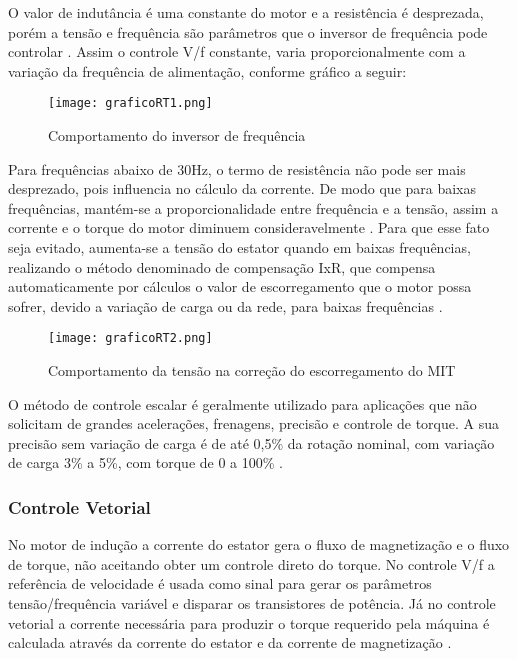 				O valor de indutância é uma constante do motor e a resistência é desprezada, porém a tensão e frequência são parâmetros que o inversor de frequência pode controlar \cite{WEGIF}. Assim o controle V/f constante, varia proporcionalmente com a variação da frequência de alimentação, conforme gráfico a seguir:

				\begin{figure}[!h]
					\centering
					\texttt{[image: graficoRT1.png]}
					\caption[Comportamento do inversor de frequência]{Comportamento do inversor de frequência \cite{WEGIF}} 
					\label{graficoRT1}
				\end{figure}

				Para frequências abaixo de 30Hz, o termo de resistência não pode ser mais desprezado, pois influencia no cálculo da corrente. De modo que para baixas frequências, mantém-se a proporcionalidade entre frequência e a tensão, assim a corrente e o torque do motor diminuem consideravelmente \cite{WEGIF}. Para que esse fato seja evitado, aumenta-se a tensão do estator quando em baixas frequências, realizando o método denominado de compensação IxR, que compensa automaticamente por cálculos o valor de escorregamento que o motor possa sofrer, devido a variação de carga ou da rede, para baixas frequências \cite{WEGIF}.

				\begin{figure}[!h]
					\centering
					\texttt{[image: graficoRT2.png]}
					\caption[Comportamento da tensão na correção do escorregamento do MIT]{Comportamento da tensão na correção do escorregamento do MIT \cite{WEGIF}} 
					\label{graficoRT2}
				\end{figure}

				O método de controle escalar é geralmente utilizado para aplicações que não solicitam de grandes acelerações, frenagens, precisão e controle de torque. A sua precisão sem variação de carga é de até 0,5\% da rotação nominal, com variação de carga 3\% a 5\%, com torque de 0 a 100\% \cite{WEGIF}.

			\subsubsection{Controle Vetorial}

				No motor de indução a corrente do estator gera o fluxo de magnetização e o fluxo de torque, não aceitando obter um controle direto do torque. No controle V/f a referência de velocidade é usada como sinal para gerar os parâmetros tensão/frequência variável e disparar os transistores de potência. Já no controle vetorial a corrente necessária para produzir o torque requerido pela máquina é calculada através da corrente do estator e da corrente de magnetização \cite{WEGIF}.
				
